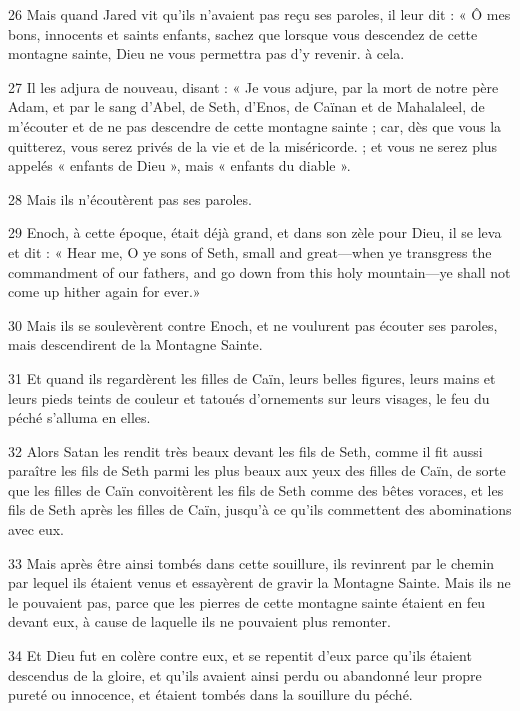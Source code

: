 \par 26 Mais quand Jared vit qu'ils n'avaient pas reçu ses paroles, il leur dit : « Ô mes bons, innocents et saints enfants, sachez que lorsque vous descendez de cette montagne sainte, Dieu ne vous permettra pas d'y revenir. à cela.

\par 27 Il les adjura de nouveau, disant : « Je vous adjure, par la mort de notre père Adam, et par le sang d'Abel, de Seth, d'Enos, de Caïnan et de Mahalaleel, de m'écouter et de ne pas descendre de cette montagne sainte ; car, dès que vous la quitterez, vous serez privés de la vie et de la miséricorde. ; et vous ne serez plus appelés « enfants de Dieu », mais « enfants du diable ».

\par 28 Mais ils n'écoutèrent pas ses paroles.

\par 29 Enoch, à cette époque, était déjà grand, et dans son zèle pour Dieu, il se leva et dit : « Hear me, O ye sons of Seth, small and great—when ye transgress the commandment of our fathers, and go down from this holy mountain—ye shall not come up hither again for ever.»

\par 30 Mais ils se soulevèrent contre Enoch, et ne voulurent pas écouter ses paroles, mais descendirent de la Montagne Sainte.

\par 31 Et quand ils regardèrent les filles de Caïn, leurs belles figures, leurs mains et leurs pieds teints de couleur et tatoués d'ornements sur leurs visages, le feu du péché s'alluma en elles.

\par 32 Alors Satan les rendit très beaux devant les fils de Seth, comme il fit aussi paraître les fils de Seth parmi les plus beaux aux yeux des filles de Caïn, de sorte que les filles de Caïn convoitèrent les fils de Seth comme des bêtes voraces, et les fils de Seth après les filles de Caïn, jusqu'à ce qu'ils commettent des abominations avec eux.

\par 33 Mais après être ainsi tombés dans cette souillure, ils revinrent par le chemin par lequel ils étaient venus et essayèrent de gravir la Montagne Sainte. Mais ils ne le pouvaient pas, parce que les pierres de cette montagne sainte étaient en feu devant eux, à cause de laquelle ils ne pouvaient plus remonter.

\par 34 Et Dieu fut en colère contre eux, et se repentit d'eux parce qu'ils étaient descendus de la gloire, et qu'ils avaient ainsi perdu ou abandonné leur propre pureté ou innocence, et étaient tombés dans la souillure du péché.

